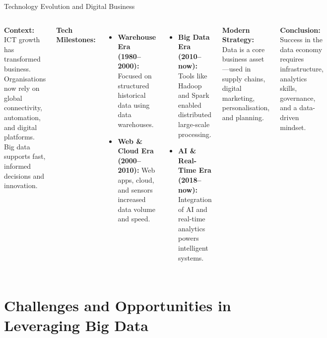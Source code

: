 \documentclass[aspectratio=169, table]{beamer}
\begin{document}
\begin{frame}[fragile]{Technology Evolution and Digital Business}
	\vspace{20pt}
	\small
	\begin{columns}[T]
		\textbf{Context:}  
		ICT growth has transformed business. Organisations now rely on global connectivity, automation, and digital platforms. Big data supports fast, informed decisions and innovation.
		
		\vspace{6pt}
		\textbf{Tech Milestones:}
		\begin{itemize}
			\item \textbf{Warehouse Era (1980–2000):} Focused on structured historical data using data warehouses.
			\item \textbf{Web \& Cloud Era (2000–2010):} Web apps, cloud, and sensors increased data volume and speed.
		\end{itemize}
		
		\begin{itemize}
			\item \textbf{Big Data Era (2010–now):} Tools like Hadoop and Spark enabled distributed large-scale processing.
			\item \textbf{AI \& Real-Time Era (2018–now):} Integration of AI and real-time analytics powers intelligent systems.
		\end{itemize}
		
		\vspace{4pt}
		\textbf{Modern Strategy:}  
		Data is a core business asset—used in supply chains, digital marketing, personalisation, and planning.
		
		\textbf{Conclusion:}  
		Success in the data economy requires infrastructure, analytics skills, governance, and a data-driven mindset.
	\end{columns}
\end{frame}

\section{Challenges and Opportunities in Leveraging Big Data}
\end{document}
